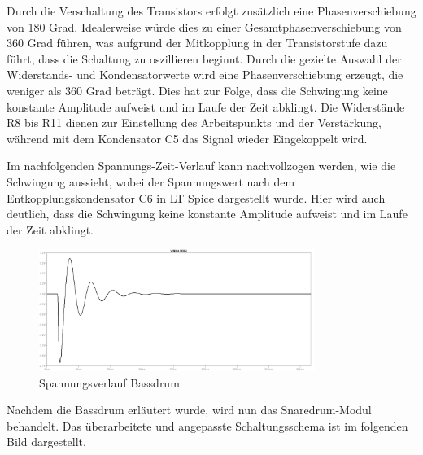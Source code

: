 Durch die Verschaltung des Transistors erfolgt zusätzlich eine Phasenverschiebung von 180 Grad. Idealerweise würde dies zu einer Gesamtphasenverschiebung von 360 Grad führen, was aufgrund der Mitkopplung in der Transistorstufe dazu führt, dass die Schaltung zu oszillieren beginnt. Durch die gezielte Auswahl der Widerstands- und Kondensatorwerte wird eine Phasenverschiebung erzeugt, die weniger als 360 Grad beträgt. Dies hat zur Folge, dass die Schwingung keine konstante Amplitude aufweist und im Laufe der Zeit abklingt. Die Widerstände R8 bis R11 dienen zur Einstellung des Arbeitspunkts und der Verstärkung, während mit dem Kondensator C5 das Signal wieder Eingekoppelt wird.

Im nachfolgenden Spannungs-Zeit-Verlauf kann nachvollzogen werden, wie die Schwingung aussieht, wobei der Spannungswert nach dem Entkopplungskondensator C6 in LT Spice dargestellt wurde. Hier wird auch deutlich, dass die Schwingung keine konstante Amplitude
aufweist und im Laufe der Zeit abklingt.

\begin{figure}[H]
    \centering
    \includegraphics[width=0.8\textwidth]{Images/Bassdrum V t.png}
    \caption[Spannungsverlauf Bassdrum]{Spannungsverlauf Bassdrum}
    \label{fig:Spannungsverlauf Bassdrum}
\end{figure}


Nachdem die Bassdrum erläutert wurde, wird nun das Snaredrum-Modul behandelt. Das überarbeitete und angepasste Schaltungsschema ist im folgenden Bild dargestellt.

